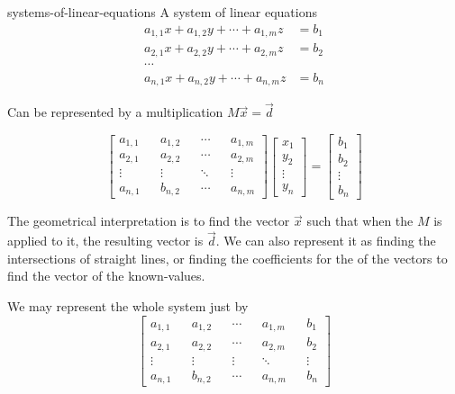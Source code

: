\documentclass[preview]{standalone}
\begin{document}
\begin{snippet}{systems-of-linear-equations}
    A system of linear equations
    \begin{align*}
        a_{1, 1}x + a_{1, 2}y + \cdots + a_{1, m}z &= b_1 \\
        a_{2, 1}x + a_{2, 2}y + \cdots + a_{2, m}z &= b_2 \\
        \cdots \\
        a_{n, 1}x + a_{n, 2}y + \cdots + a_{n, m}z &= b_n
    \end{align*}

    Can be represented by a \matrix multiplication \(M\vec{x}=\vec{d}\)

    \[
        \begin{bmatrix}
            a_{1, 1} && a_{1, 2} && \cdots && a_{1, m} \\
            a_{2, 1} && a_{2, 2} && \cdots && a_{2, m} \\
            \vdots && \vdots && \ddots && \vdots \\
            a_{n, 1} && b_{n, 2} && \cdots && a_{n, m}
        \end{bmatrix}
        \begin{bmatrix}
            x_1 \\ y_2 \\ \vdots \\ y_n
        \end{bmatrix}
        =
        \begin{bmatrix}
            b_1 \\ b_2 \\ \vdots \\ b_n
        \end{bmatrix}
    \]

    The geometrical interpretation is to find the vector \(\vec{x}\)
    such that when the \matrix \(M\) is applied to it, the resulting vector is \(\vec{d}\).
    We can also represent it as finding the intersections of straight lines, or finding the coefficients
    for the  of the vectors to find the vector of the known-values.

    We may represent the whole system just by
    \[
        \begin{bmatrix}
            a_{1, 1} && a_{1, 2} && \cdots && a_{1, m} && b_1 \\
            a_{2, 1} && a_{2, 2} && \cdots && a_{2, m} && b_2 \\
            \vdots && \vdots && \vdots && \ddots && \vdots \\
            a_{n, 1} && b_{n, 2} && \cdots && a_{n, m} && b_n
        \end{bmatrix}
    \]
\end{snippet}
\end{document}

